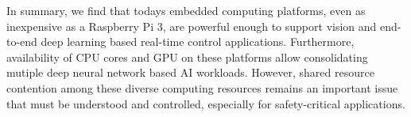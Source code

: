 

In summary, we find that todays embedded computing platforms, even as
inexpensive as a Raspberry Pi 3, are powerful enough to support
vision and end-to-end deep learning based real-time control
applications. Furthermore, availability of CPU cores and GPU on these
platforms allow consolidating mutiple deep neural network based AI
workloads. However, shared resource contention among these diverse
computing resources remains an important issue that must be understood
and controlled, especially for safety-critical applications.
